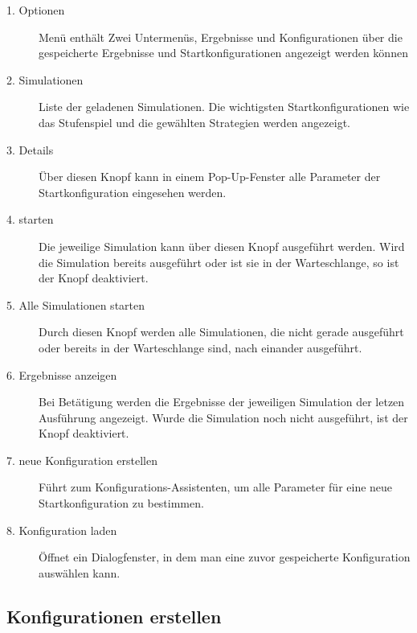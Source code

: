 \begin{description}


\item[1. Optionen] Menü enthält Zwei Untermenüs, Ergebnisse und Konfigurationen über die gespeicherte Ergebnisse und Startkonfigurationen angezeigt werden können

\item[2. Simulationen] Liste der geladenen Simulationen. Die wichtigsten Startkonfigurationen wie das Stufenspiel und die gewählten Strategien werden angezeigt.

\item[3. Details] Über diesen Knopf kann in einem Pop-Up-Fenster alle Parameter der Startkonfiguration eingesehen werden.

\item[4. starten] Die jeweilige Simulation kann über diesen Knopf ausgeführt werden. Wird die Simulation bereits ausgeführt oder ist sie in der Warteschlange, so ist der Knopf deaktiviert.

\item[5. Alle Simulationen starten] Durch diesen Knopf werden alle Simulationen, die nicht gerade ausgeführt oder bereits in der Warteschlange sind, nach einander ausgeführt. 

\item[6. Ergebnisse anzeigen] Bei Betätigung werden die Ergebnisse der jeweiligen Simulation der letzen Ausführung angezeigt. Wurde die Simulation noch nicht ausgeführt, ist der Knopf deaktiviert.

\item[7. neue Konfiguration erstellen] Führt zum Konfigurations-Assistenten, um alle Parameter für eine neue Startkonfiguration zu bestimmen.

\item[8. Konfiguration laden] Öffnet ein Dialogfenster, in dem man eine zuvor gespeicherte Konfiguration auswählen kann.

\end{description}


\subsection{Konfigurationen erstellen}

